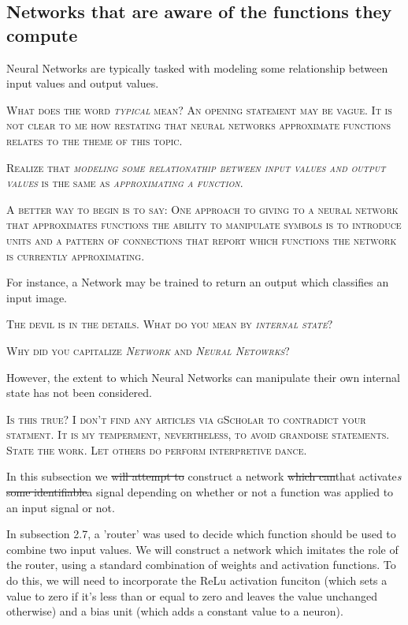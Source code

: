 \documentclass{article}
\newcommand{\mycomment}[1]{
	{\color{red}\textsc{#1}}
}
\begin{document}
	
	\subsection{Networks that are aware of the functions they compute}
	
		Neural Networks are typically tasked with modeling some relationship between input values and output values. 

		\mycomment{What does the word \emph{typical} mean? An opening statement may be vague. It is not clear to me how restating that neural networks approximate functions relates to the theme of this topic. }

		\mycomment{Realize that \emph{modeling some relationathip between input values and output values} is the same as \emph{approximating a function}.}

		\mycomment{A better way to begin is to say: One approach to giving to a neural network that approximates functions the ability to manipulate symbols is to introduce units and a pattern of connections that report which functions the network is currently approximating.}

For instance, a Network may be trained to return an output which classifies an input image. 

	\mycomment{The devil is in the details. What do you mean by \emph{internal state}?}

	\mycomment{Why did you capitalize \emph{Network} and \emph{Neural Netowrks}?}

However, the extent to which Neural Networks can manipulate their own internal state has not been considered. 

	\mycomment{Is this true? I don't find any articles via gScholar to contradict your statment. It is my temperment, nevertheless, to avoid grandoise statements. State the work. Let others do perform interpretive dance.}

In this subsection we \sout{will attempt to} construct a network \sout{which can}that activate\emph{s} \sout{some identifiable}a signal depending on whether or not a function was applied to an input signal or not. 
		
		In subsection 2.7, a 'router' was used to decide which function should be used to combine two input values. We will construct a network which imitates the role of the router, using a standard combination of weights and activation functions. To do this, we will need to incorporate the ReLu activation funciton (which sets a value to zero if it's less than or equal to zero and leaves the value unchanged otherwise) and a bias unit (which adds a constant value to a neuron). 
\end{document}
